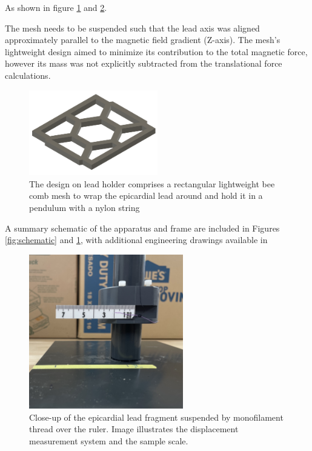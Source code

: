 As shown in figure \ref{fig:leadHolder} and \ref{fig:leadcloseup}.

The mesh needs to be suspended such that the lead axis was aligned approximately parallel to the magnetic field gradient (Z-axis). The mesh's lightweight design aimed to minimize its contribution to the total magnetic force, however its mass was not explicitly subtracted from the translational force calculations.

\begin{figure}[H]
	\centering
	\includegraphics[width=0.5\textwidth]{Assests/frameHolder.png}
	\caption[3D render of the design on lead holder]{The design on lead holder comprises a rectangular lightweight bee comb mesh to wrap the epicardial lead around and hold it in a pendulum with a nylon string}	
	\label{fig:leadHolder}
\end{figure}

A summary schematic of the apparatus and frame are included in Figures \ref{fig:schematic} and \ref{fig:leadHolder}, with additional engineering drawings available in %

\begin{figure}[H]
	\centering
	\includegraphics[width=0.6\textwidth]{Assests/Picture2.jpg}
	\caption{Close-up of the epicardial lead fragment suspended by monofilament thread over the ruler. Image illustrates the displacement measurement system and the sample scale.}
	\label{fig:leadcloseup}
\end{figure}

